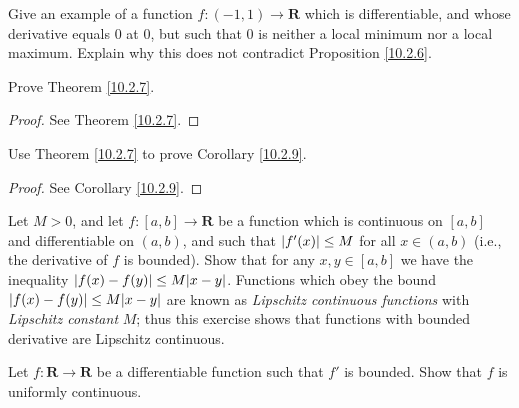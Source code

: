 \begin{exercise}\label{ex 10.2.3}
    Give an example of a function \(f : (-1, 1) \to \mathbf{R}\) which is differentiable, and whose derivative equals \(0\) at \(0\), but such that \(0\) is neither a local minimum nor a local maximum.
    Explain why this does not contradict Proposition \ref{10.2.6}.
\end{exercise}

\begin{exercise}\label{ex 10.2.4}
    Prove Theorem \ref{10.2.7}.
\end{exercise}

\begin{proof}
    See Theorem \ref{10.2.7}.
\end{proof}

\begin{exercise}\label{ex 10.2.5}
    Use Theorem \ref{10.2.7} to prove Corollary \ref{10.2.9}.
\end{exercise}

\begin{proof}
    See Corollary \ref{10.2.9}.
\end{proof}

\begin{exercise}\label{ex 10.2.6}
    Let \(M > 0\), and let \(f : [a, b] \to \mathbf{R}\) be a function which is continuous on \([a, b]\) and differentiable on \((a, b)\), and such that \(\abs*{f'(x)} \leq M\) for all \(x \in (a, b)\) (i.e., the derivative of \(f\) is bounded).
    Show that for any \(x, y \in [a, b]\) we have the inequality \(\abs*{f(x) - f(y)} \leq M \abs*{x - y}\).
    Functions which obey the bound \(\abs*{f(x) - f(y)} \leq M \abs*{x - y}\) are known as \emph{Lipschitz continuous functions} with \emph{Lipschitz constant} \(M\);
    thus this exercise shows that functions with bounded derivative are Lipschitz continuous.
\end{exercise}

\begin{exercise}\label{ex 10.2.7}
    Let \(f : \mathbf{R} \to \mathbf{R}\) be a differentiable function such that \(f'\) is bounded.
    Show that \(f\) is uniformly continuous.
\end{exercise}